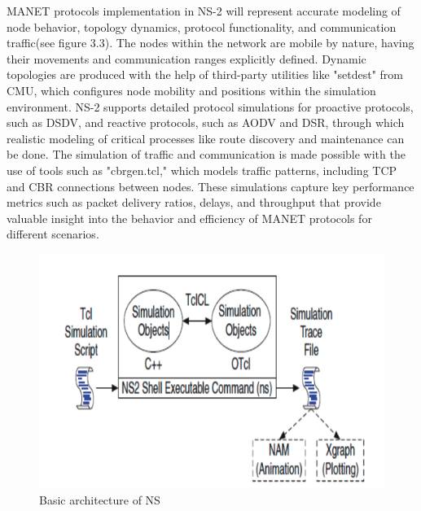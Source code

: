 \documentclass[]{nsm-thesis}
\begin{document}
MANET protocols implementation in NS-2 will represent accurate modeling of node behavior, topology dynamics, protocol functionality, and communication traffic(see figure 3.3). The nodes within the network are mobile by nature, having their movements and communication ranges explicitly defined. Dynamic topologies are produced with the help of third-party utilities like "setdest" from CMU, which configures node mobility and positions within the simulation environment. NS-2 supports detailed protocol simulations for proactive protocols, such as DSDV, and reactive protocols, such as AODV and DSR, through which realistic modeling of critical processes like route discovery and maintenance can be done. The simulation of traffic and communication is made possible with the use of tools such as "cbrgen.tcl," which models traffic patterns, including TCP and CBR connections between nodes. These simulations capture key performance metrics such as packet delivery ratios, delays, and throughput that provide valuable insight into the behavior and efficiency of MANET protocols for different scenarios.
\begin{figure}[h]
\graphicspath{{/image/}} %
\centering
\includegraphics[scale=0.4]{image/Architectur_of_NS.png} %
\caption{Basic architecture of NS\cite{al2018performance}}
\label{fig:mesh4} %
\end{figure}
\clearpage
\end{document}
